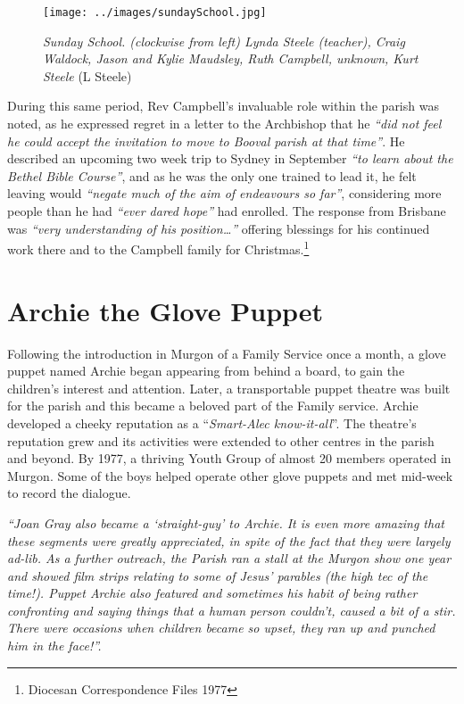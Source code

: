 \begin{figure}[!htb]
\begin{center}
\texttt{[image: ../images/sundaySchool.jpg]}
\caption{{\itshape Sunday School. (clockwise from left) Lynda Steele (teacher), Craig Waldock, Jason and Kylie Maudsley, Ruth Campbell, unknown, Kurt Steele} {\scriptsize(L Steele)}}
\end{center}
\end{figure}




During this same period, Rev Campbell's invaluable role within the parish was noted, as he expressed regret in a letter to the Archbishop that he \emph{``did not feel he could accept the invitation to move to Booval parish at that time''}. He described an upcoming two week trip to Sydney in September \emph{``to learn about the Bethel Bible Course''}, and as he was the only one trained to lead it, he felt leaving would \emph{``negate much of the aim of endeavours so far''}, considering more people than he had \emph{``ever dared hope''} had enrolled. The response from Brisbane was \emph{``very understanding of his position\ldots''} offering blessings for his continued work there and to the Campbell family for Christmas.\footnote{Diocesan Correspondence Files 1977}


\section{Archie the Glove Puppet}



Following the introduction in Murgon of a Family Service once a month, a glove puppet named Archie began appearing from behind a board, to gain the children's interest and attention. Later, a transportable puppet theatre was built for the parish and this became a beloved part of the Family service. Archie developed a cheeky reputation as a ``\emph{Smart-Alec know-it-all}''. The theatre's reputation grew and its activities were extended to other centres in the parish and beyond. By 1977, a thriving Youth Group of almost 20 members operated in Murgon. Some of the boys helped operate other glove puppets and met mid-week to record the dialogue.



\emph{``Joan Gray also became a `straight-guy' to Archie. It is even more amazing that these segments were greatly appreciated, in spite of the fact that they were largely ad-lib. As a further outreach, the Parish ran a stall at the Murgon show one year and showed film strips relating to some of Jesus' parables (the high tec of the time!). Puppet Archie also featured and sometimes his habit of being rather confronting and saying things that a human person couldn't, caused a bit of a stir. There were occasions when children became so upset, they ran up and punched him in the face!''.}



